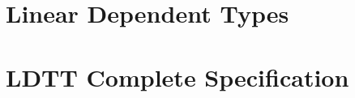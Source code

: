 \documentclass{article}
\date{}
\renewcommand{\LDTTall}{
  \LDTTgrammar\\[1em]
  \LDTTdefnss}
\begin{document}
\section{Linear Dependent Types}
\label{sec:linear_dependent_types}


\section{LDTT Complete Specification}
\label{sec:ldtt_complete_specification}
\LDTTall{}
\end{document}
